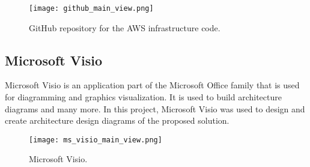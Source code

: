 \begin{figure}[H]
    \centering \texttt{[image: github\_main\_view.png]}
    \caption{GitHub repository for the AWS infrastructure code.}
    \label{fig:github}
\end{figure}



\subsection{Microsoft Visio}
\label{subsec:ms-visio}

Microsoft Visio is an application part of the Microsoft Office family that is used for diagramming and graphics visualization. It is used to build architecture diagrams and many more. In this project, Microsoft Visio was used to design and create architecture design diagrams of the proposed solution.

\begin{figure}[H]
    \centering \texttt{[image: ms\_visio\_main\_view.png]}
    \caption{Microsoft Visio.}
    \label{fig:ms-visio}
\end{figure}








